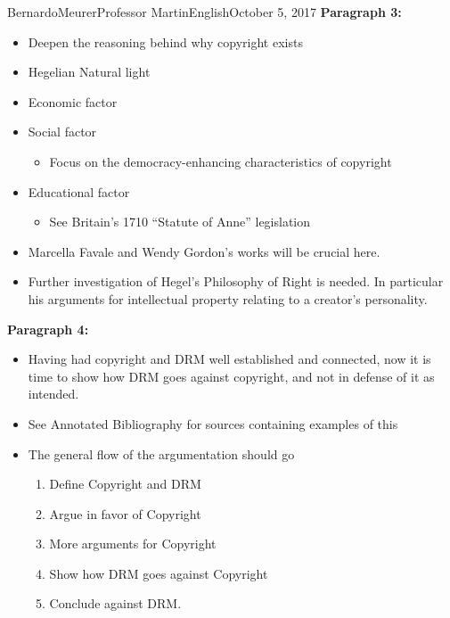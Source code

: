 \documentclass[12pt,letterpaper]{article}
\begin{document}
\begin{mla}{Bernardo}{Meurer}{Professor Martin}{English}{October 5, 2017}
        \noindent \textbf{Paragraph 3:}

            \begin{itemize}
                \item Deepen the reasoning behind why copyright exists
                \item Hegelian Natural light
                \item Economic factor
                \item Social factor
                \begin{itemize}
                    \item Focus on the democracy-enhancing characteristics of copyright
                \end{itemize}
                \item Educational factor
                \begin{itemize}
                    \item See Britain's 1710 ``Statute of Anne'' legislation
                \end{itemize}
                \item Marcella Favale and Wendy Gordon's works will be crucial here.
                \item Further investigation of Hegel's Philosophy of Right is needed. In particular his arguments for intellectual property relating to a creator's personality.
            \end{itemize}
        
        \noindent \textbf{Paragraph 4:}

            \begin{itemize}
                \item Having had copyright and DRM well established and connected, now it is time to show how DRM goes against copyright, and not in defense of it as intended.
                \item See Annotated Bibliography for sources containing examples of this
                \item The general flow of the argumentation should go
                \begin{enumerate}
                    \item Define Copyright and DRM
                    \item Argue in favor of Copyright
                    \item More arguments for Copyright
                    \item Show how DRM goes against Copyright
                    \item Conclude against DRM. 
                \end{enumerate}
            \end{itemize}
        

        \end{mla}
        
\end{document}
